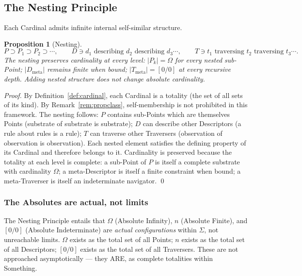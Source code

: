 \documentclass[11pt,a4paper]{article}
\newtheorem{proposition}[theorem]{Proposition}
\theoremstyle{definition}
\theoremstyle{remark}
\begin{document}
\subsection{The Nesting Principle}\label{subsec:nesting}

Each Cardinal admits infinite internal self-similar structure.

\begin{proposition}[Nesting]\label{prop:nesting}
\[
P \supset P_{1} \supset P_{2} \supset \cdots, \qquad
D \ni d_{1} \text{ describing } d_{2} \text{ describing } d_{3} \cdots, \qquad
T \ni t_{1} \text{ traversing } t_{2} \text{ traversing } t_{3} \cdots.
\]
The nesting preserves cardinality at every level: $|P_{k}| = \Omega$ for every nested sub-Point; $|D_{\mathrm{meta}}|$ remains finite when bound; $|T_{\mathrm{meta}}| = [0/0]$ at every recursive depth. Adding nested structure does not change absolute cardinality.
\end{proposition}

\begin{proof}
By Definition~\ref{def:cardinal}, each Cardinal is a totality (the set of all sets of its kind). By Remark~\ref{rem:propclass}, self-membership is not prohibited in this framework. The nesting follows: $P$ contains sub-Points which are themselves Points (substrate of substrate is substrate); $D$ can describe other Descriptors (a rule about rules is a rule); $T$ can traverse other Traversers (observation of observation is observation). Each nested element satisfies the defining property of its Cardinal and therefore belongs to it. Cardinality is preserved because the totality at each level is complete: a sub-Point of $P$ is itself a complete substrate with cardinality $\Omega$; a meta-Descriptor is itself a finite constraint when bound; a meta-Traverser is itself an indeterminate navigator. \qed
\end{proof}

\subsubsection{The Absolutes are actual, not limits}\label{subsubsec:absolutes-actual}

The Nesting Principle entails that $\Omega$ (Absolute Infinity), $n$ (Absolute Finite), and $[0/0]$ (Absolute Indeterminate) are \emph{actual configurations} within $\Sigma$, not unreachable limits. $\Omega$ exists as the total set of all Points; $n$ exists as the total set of all Descriptors; $[0/0]$ exists as the total set of all Traversers. These are not approached asymptotically --- they ARE, as complete totalities within Something.
\end{document}

